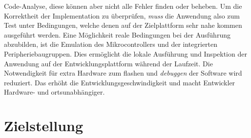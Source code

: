 Code-Analyse, diese können aber nicht alle Fehler finden oder beheben.
Um die Korrektheit der Implementation zu überprüfen, \textit{muss} die
Anwendung also zum Test unter Bedingungen, welche denen auf der Zielplattform
sehr nahe kommen ausgeführt werden.\newline
Eine Möglichkeit reale Bedingungen bei der Ausführung abzubilden, ist die
Emulation des Mikrocontrollers und der integrierten Peripheriebaugruppen.
Dies ermöglicht die lokale Ausführung und Inspektion der Anwendung auf der
Entwicklungsplattform während der Laufzeit.
Die Notwendigkeit für extra Hardware zum flashen und \textit{debuggen} der
Software wird reduziert.
Das erhöht die Entwicklungsgeschwindigkeit und macht Entwickler Hardware- und
ortsunabhängiger.

\section{Zielstellung}

